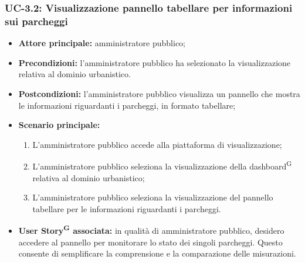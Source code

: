 \documentclass[8pt]{article}
\newcommand{\glossterm}[1]{#1\textsuperscript{G}} %
\begin{document}
\subsubsection*{UC-3.2: Visualizzazione pannello tabellare per informazioni sui parcheggi}
\begin{itemize}
    \item \textbf{Attore principale:} amministratore pubblico;
    \item \textbf{Precondizioni:} l'amministratore pubblico ha selezionato la visualizzazione
        relativa al dominio urbanistico.
    \item \textbf{Postcondizioni:} l'amministratore pubblico visualizza un pannello che mostra le informazioni riguardanti i parcheggi, in formato tabellare;
    \item \textbf{Scenario principale:} 
    \begin{enumerate}
    \item L'amministratore pubblico accede alla piattaforma di visualizzazione;
    \item L'amministratore pubblico seleziona la visualizzazione della \glossterm{dashboard} relativa al dominio
        urbanistico;
    \item L'amministratore pubblico seleziona la visualizzazione del pannello tabellare per le informazioni riguardanti i parcheggi.
    \end{enumerate}
    \item \textbf{\glossterm{User Story} associata:} in qualità di amministratore pubblico, desidero accedere al pannello per monitorare lo stato dei singoli parcheggi. Questo consente di semplificare la comprensione e la comparazione delle misurazioni.
\end{itemize}
\end{document}
